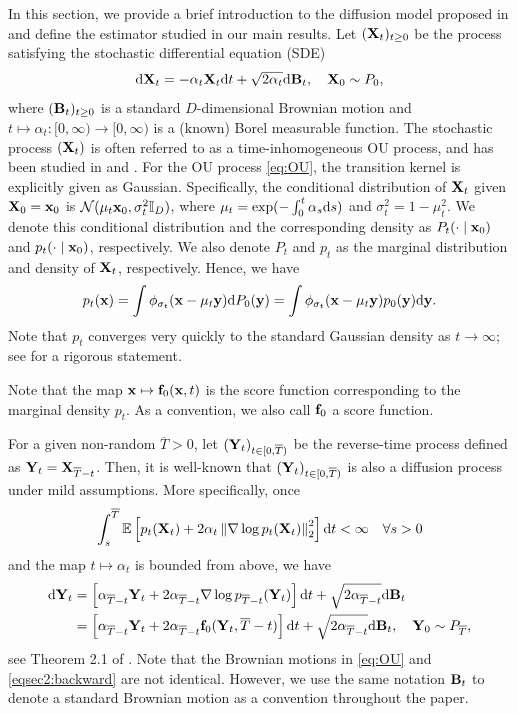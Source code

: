\documentclass[twoside,11pt]{article}
\def\cN{\mathcal N}
\newcommand{\bB}{{\bf B}}
\newcommand{\bff}{{\bf f}}
\newcommand{\bx}{{\bf x}}
\newcommand{\bX}{{\bf X}}
\newcommand{\by}{{\bf y}}
\newcommand{\bY}{{\bf Y}}
\newcommand{\bbE}{{\mathbb E}}
\newcommand{\bbI}{{\mathbb I}}
\newcommand{\be}{\begin{equation}}
\newcommand{\ee}{\end{equation}}
\newcommand{\bean}{\setlength\arraycolsep{1pt}\begin{eqnarray*}}
\newcommand{\eean}{\end{eqnarray*}}
\def\d{{\rm d}}
\begin{document}
In this section, we provide a brief introduction to the diffusion model proposed in \citet{song2021scorebased} and define the estimator studied in our main results.
Let $( \bX_{t} )_{t \geq 0}$ be the process satisfying the stochastic differential equation (SDE)
\be \label{eq:OU}
\d {\bX}_t = -  \alpha_{t} {\bX}_t \d t + \sqrt{2\alpha_{t}} \d \bB_t,\quad \bX_0 \sim P_0,
\ee
where $( \bB_{t} )_{t \geq 0} $ is a standard $D$-dimensional Brownian motion and $t \mapsto \alpha_{t}: [0, \infty) \to [0, \infty)$ is a (known) Borel measurable function.
The stochastic process $( \bX_{t} ) $ is often referred to as a time-inhomogeneous OU process, and has been studied in \citet{song2021scorebased} and \citet{chen2023sampling}.
For the OU process \eqref{eq:OU}, the transition kernel is explicitly given as Gaussian.
Specifically, the conditional distribution of $\bX_t$ given $\bX_0 = \bx_0$ is $\cN(\mu_t \bx_0, \sigma_t^2 \bbI_D)$, where $\mu_t = \exp(-\int_{0}^{t} \alpha_s \d s)$ and $\sigma_t^2 = 1-\mu_t^2$.
We denote this conditional distribution and the corresponding density as $P_{t}(\cdot \mid  \bx_0)$ and $p_{t}(\cdot \mid \bx_0)$, respectively.
We also denote $P_t$ and $p_t$ as the marginal distribution and density of $\bX_t$, respectively.
Hence, we have
\bean
  p_t(\bx) = \int \phi_{\sigma_t}(\bx - \mu_t \by) \d P_0(\by)
  = \int \phi_{\sigma_t}(\bx - \mu_t \by) p_0(\by) \d \by.
\eean
Note that $p_{t}$ converges very quickly to the standard Gaussian density as $t \to \infty $; see \citet{bakry2014analysis} for a rigorous statement.

Note that the map $\bx \mapsto \bff_0(\bx, t)$ is the score function corresponding to the marginal density $p_t$.
As a convention, we also call $\bff_0$ a score function.

For a given non-random $\overline{T} > 0$, let $(\bY_{t})_{t \in [0, \overline{T}) }$ be the reverse-time process defined as $\bY_{t} = \bX_{\overline{T}-t}$.
Then, it is well-known \citep{anderson1982reverse} that $(\bY_{t})_{t \in [0, \overline{T}) }$ is also a diffusion process under mild assumptions. 
More specifically, once
\bean
\int_{s}^{\overline{T}} \bbE \left[  p_t(\bX_t) + 2 \alpha_{t} \left\| \nabla \log p_t(\bX_t) \right\|_2^2 \right] \d t < \infty
\quad \forall s >0
\eean
and the map $t \mapsto \alpha_{t}$ is bounded from above,
we have 
\be \begin{split} \label{eqsec2:backward}
\d \bY_t &= \left[\alpha_{\overline{T}-t} \bY_t + 2 \alpha_{\overline{T}-t} \nabla \log p_{\overline{T}-t}(\bY_t) \right] \d t + \sqrt{2\alpha_{\overline{T}-t}} \d \bB_t
\\
&= \left[\alpha_{\overline{T}-t} \bY_t + 2 \alpha_{\overline{T}-t} \bff_0(\bY_t, \overline T - t) \right] \d t + \sqrt{2\alpha_{\overline{T}-t}} \d \bB_t,\quad \bY_0 \sim P_{\overline{T}},
\end{split} \ee
see Theorem 2.1 of \citet{haussmann1986time}.
Note that the Brownian motions in \eqref{eq:OU} and \eqref{eqsec2:backward} are not identical. However, we use the same notation $\bB_t$ to denote a standard Brownian motion as a convention throughout the paper.
\end{document}
